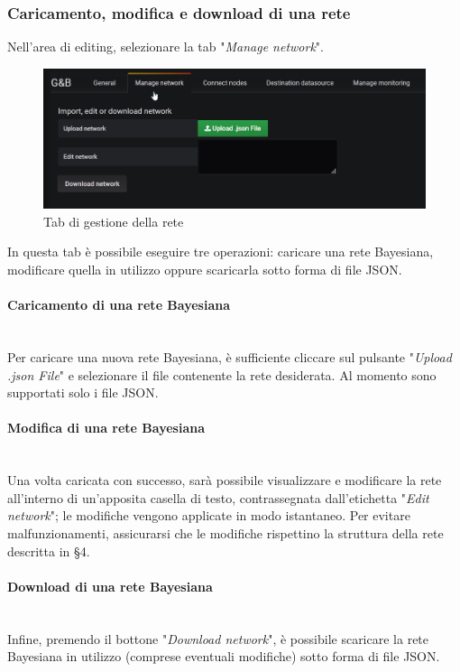 \subsubsection{Caricamento, modifica e download di una rete}
Nell'area di editing, selezionare la tab "\textit{Manage network}".
\begin{figure} [H]
	\centering
	\includegraphics[scale=0.55]{Img/managenet} 
	\caption{Tab di gestione della rete} \label{} 
\end{figure} 
In questa tab è possibile eseguire tre operazioni: caricare una rete Bayesiana, modificare quella in utilizzo oppure scaricarla sotto forma di file JSON.
\paragraph{Caricamento di una rete Bayesiana}~\\
	Per caricare una nuova rete Bayesiana, è sufficiente cliccare sul pulsante "\textit{Upload .json File}" e selezionare il file contenente la rete desiderata. Al momento sono supportati solo i file JSON.
\paragraph{Modifica di una rete Bayesiana}~\\
	Una volta caricata con successo, sarà possibile visualizzare e modificare la rete all'interno di un'apposita casella di testo, contrassegnata dall'etichetta "\textit{Edit network}"; le modifiche vengono applicate in modo istantaneo. Per evitare malfunzionamenti, assicurarsi che le modifiche rispettino la struttura della rete descritta in §4.
\paragraph{Download di una rete Bayesiana}~\\
	Infine, premendo il bottone "\textit{Download network}", è possibile scaricare la rete Bayesiana in utilizzo (comprese eventuali modifiche) sotto forma di file JSON.